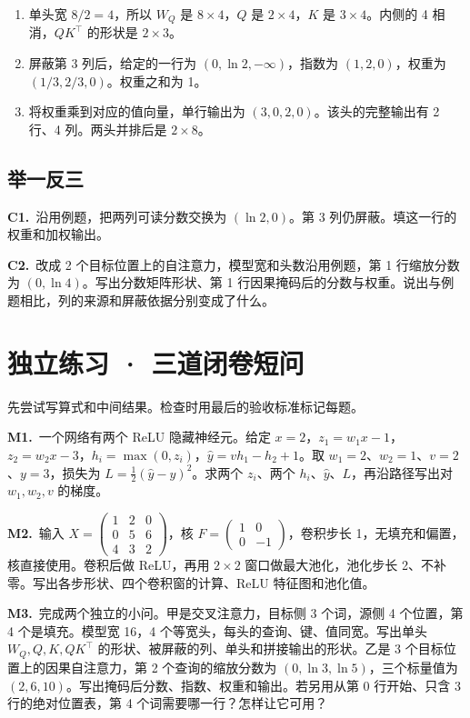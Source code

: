 \documentclass[UTF8,a4paper,11pt]{ctexart}
\newcommand{\CompactQuestion}[2]{\par\noindent\textbf{#1.}\ #2\par\vspace{.8em}}
\begin{document}
\begin{enumerate}
\item 单头宽 $8/2=4$，所以 $W_Q$ 是 $8\times4$，$Q$ 是 $2\times4$，$K$ 是 $3\times4$。内侧的 4 相消，$QK^\top$ 的形状是 $2\times3$。
\item 屏蔽第 3 列后，给定的一行为 $(0,\ln2,-\infty)$，指数为 $(1,2,0)$，权重为 $(1/3,2/3,0)$。权重之和为 1。
\item 将权重乘到对应的值向量，单行输出为 $(3,0,2,0)$。该头的完整输出有 2 行、4 列。两头并排后是 $2\times8$。
\end{enumerate}
\subsection{举一反三}
\CompactQuestion{C1}{沿用例题，把两列可读分数交换为 $(\ln2,0)$。第 3 列仍屏蔽。填这一行的权重和加权输出。}
\CompactQuestion{C2}{改成 2 个目标位置上的自注意力，模型宽和头数沿用例题，第 1 行缩放分数为 $(0,\ln4)$。写出分数矩阵形状、第 1 行因果掩码后的分数与权重。说出与例题相比，列的来源和屏蔽依据分别变成了什么。}
\clearpage
\section{独立练习 · 三道闭卷短问}
先尝试写算式和中间结果。检查时用最后的验收标准标记每题。

\CompactQuestion{M1}{一个网络有两个 ReLU 隐藏神经元。给定 $x=2$，$z_1=w_1x-1$，$z_2=w_2x-3$，$h_i=\max(0,z_i)$，$\hat y=vh_1-h_2+1$。取 $w_1=2$、$w_2=1$、$v=2$、$y=3$，损失为 $L=\frac12(\hat y-y)^2$。求两个 $z_i$、两个 $h_i$、$\hat y$、$L$，再沿路径写出对 $w_1,w_2,v$ 的梯度。}
\CompactQuestion{M2}{输入 $X=\begin{pmatrix}1&2&0\\0&5&6\\4&3&2\end{pmatrix}$，核 $F=\begin{pmatrix}1&0\\0&-1\end{pmatrix}$，卷积步长 1，无填充和偏置，核直接使用。卷积后做 ReLU，再用 $2\times2$ 窗口做最大池化，池化步长 2、不补零。写出各步形状、四个卷积窗的计算、ReLU 特征图和池化值。}
\CompactQuestion{M3}{完成两个独立的小问。甲是交叉注意力，目标侧 3 个词，源侧 4 个位置，第 4 个是填充。模型宽 16，4 个等宽头，每头的查询、键、值同宽。写出单头 $W_Q,Q,K,QK^\top$ 的形状、被屏蔽的列、单头和拼接输出的形状。乙是 3 个目标位置上的因果自注意力，第 2 个查询的缩放分数为 $(0,\ln3,\ln5)$，三个标量值为 $(2,6,10)$。写出掩码后分数、指数、权重和输出。若另用从第 0 行开始、只含 3 行的绝对位置表，第 4 个词需要哪一行？怎样让它可用？}
\clearpage
\end{document}
